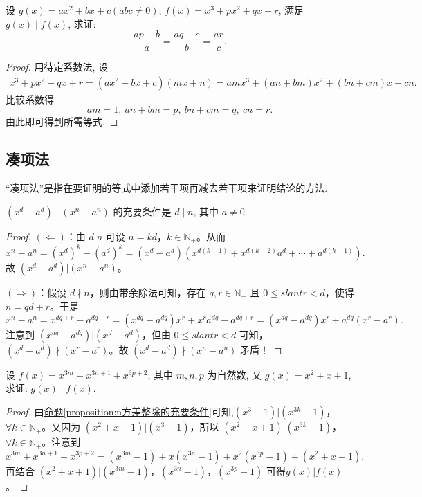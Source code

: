 \documentclass[../../main.tex]{subfiles}
\begin{document}
\begin{example}
设 \(g(x)=ax^{2}+bx + c(abc\neq0)\), \(f(x)=x^{3}+px^{2}+qx + r\), 满足 \(g(x)\mid f(x)\), 求证:
\[
\frac{ap - b}{a}=\frac{aq - c}{b}=\frac{ar}{c}.
\]
\end{example}
\begin{proof}
用待定系数法, 设
\begin{align*}
x^{3}+px^{2}+qx + r=(ax^{2}+bx + c)(mx + n)
=amx^{3}+(an + bm)x^{2}+(bn + cm)x+cn.
\end{align*}
比较系数得
\[
am = 1,\ an + bm = p,\ bn + cm = q,\ cn = r.
\]
由此即可得到所需等式. 
\end{proof}

\subsection{凑项法}

“凑项法”是指在要证明的等式中添加若干项再减去若干项来证明结论的方法.

\begin{proposition}\label{proposition:n方差整除的充要条件}
\((x^{d}-a^{d}) \mid (x^{n}-a^{n})\) 的充要条件是 \(d\mid n\), 其中 \(a\neq0\).
\end{proposition}
\begin{proof}
$(\Leftarrow)$：由 \(d|n\) 可设 \(n = kd\)，\(k\in \mathbb{N}_+\)。从而
\[
x^n - a^n=(x^d)^k-(a^d)^k=(x^d - a^d)(x^{d(k - 1)}+x^{d(k - 2)}a^d+\cdots +a^{d(k - 1)}).
\]
故 \((x^d - a^d)|(x^n - a^n)\)。

\((\Rightarrow)\)：假设 \(d\nmid n\)，则由带余除法可知，存在 \(q, r\in \mathbb{N}_+\) 且 \(0\leqslant slant r < d\)，使得 \(n = qd + r\)。于是
\[
x^n - a^n=x^{dq + r}-a^{dq + r}=(x^{dq}-a^{dq})x^r+x^ra^{dq}-a^{dq + r}=(x^{dq}-a^{dq})x^r+a^{dq}(x^r - a^r).
\]
注意到 \((x^{dq}-a^{dq})|(x^d - a^d)\)，但由 \(0\leqslant slant r < d\) 可知，\((x^d - a^d)\nmid (x^r - a^r)\)。故 \((x^d - a^d)\nmid (x^n - a^n)\) 矛盾！
\end{proof}

\begin{example}
设 \(f(x)=x^{3m}+x^{3n + 1}+x^{3p+2}\), 其中 \(m,n,p\) 为自然数, 又 \(g(x)=x^{2}+x + 1\), 求证: \(g(x)\mid f(x)\).
\end{example}
\begin{proof}
由\hyperref[proposition:n方差整除的充要条件]{命题\ref{proposition:n方差整除的充要条件}}可知,\((x^3 - 1)|(x^{3k} - 1)\)，\(\forall k\in \mathbb{N}_+\)。又因为 \((x^2 + x + 1)|(x^3 - 1)\)，所以 \((x^2 + x + 1)|(x^{3k} - 1)\)，\(\forall k\in \mathbb{N}_+\)。注意到
\[
x^{3m}+x^{3n + 1}+x^{3p + 2}=(x^{3m}-1)+x(x^{3n}-1)+x^2(x^{3p}-1)+(x^2 + x + 1).
\]
再结合 \((x^2 + x + 1)|(x^{3m}-1)\)，\((x^{3n}-1)\)，\((x^{3p}-1)\) 可得\(g(x)|f(x)\)。
\end{proof}
\end{document}
